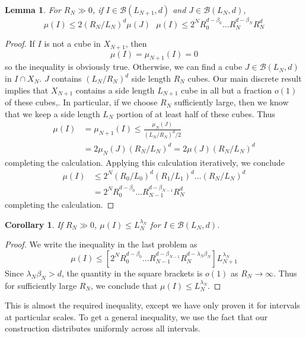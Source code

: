 \documentclass{article}
\theoremstyle{plain}
\newtheorem{lemma}{Lemma}
\newtheorem*{corollary}{Corollary}
\theoremstyle{plain}
\begin{document}
\begin{multicols}{2}
\begin{lemma}
	For $R_N \gg 0$, if $I \in \mathcal{B}(L_{N+1},d)$ and $J \in \mathcal{B}(L_N,d)$,
	\[ \mu(I) \leq 2 (R_N/L_N)^d \mu(J)\ \ \ \mu(I) \leq 2^N R_0^{d - \beta_0} \dots R_N^{d - \beta_N} R_N^d \]
\end{lemma}
\begin{proof}
	If $I$ is not a cube in $X_{N+1}$, then
	\[ \mu(I) = \mu_{N+1}(I) = 0 \]
	so the inequality is obviously true. Otherwise, we can find a cube $J \in \mathcal{B}(L_N,d)$ in $I \cap X_N$. $J$ contains $(L_N/R_N)^d$ side length $R_N$ cubes. Our main discrete result implies that $X_{N+1}$ contains a side length $L_{N+1}$ cube in all but a fraction $o(1)$ of these cubes,. In particular, if we choose $R_N$ sufficiently large, then we know that we keep a side length $L_N$ portion of at least half of these cubes. Thus
	\begin{align*}
		\mu(I) &= \mu_{N+1}(I) \leq \frac{\mu_N(J)}{(L_N/R_N)^d/2}\\
		&= 2 \mu_N(J) (R_N/L_N)^d = 2 \mu(J) (R_N/L_N)^d
	\end{align*}
	completing the calculation. Applying this calculation iteratively, we conclude
	\begin{align*}
		\mu(I) &\leq 2^N (R_0/L_0)^d (R_1/L_1)^d \dots (R_N/L_N)^d\\
		&= 2^N R_0^{d - \beta_0} \dots R_{N-1}^{d - \beta_{N-1}} R_N^d
	\end{align*}
	completing the calculation.
\end{proof}

\begin{corollary}
	If $R_N \gg 0$, $\mu(I) \leq L_N^{\lambda_N}$ for $I \in \mathcal{B}(L_N,d)$.
\end{corollary}
\begin{proof}
	We write the inequality in the last problem as
	\[ \mu(I) \leq [2^N R_0^{d - \beta_0} \dots R_{N-1}^{d - \beta_{N-1}} R_N^{d - \lambda_N \beta_N}] L_{N+1}^{\lambda_N} \]
	Since $\lambda_N \beta_N > d$, the quantity in the square brackets is $o(1)$ as $R_N \to \infty$. Thus for sufficiently large $R_N$, we conclude that $\mu(I) \leq L_N^{\lambda_N}$.
\end{proof}

This is almost the required inequality, except we have only proven it for intervals at particular scales. To get a general inequality, we use the fact that our construction distributes uniformly across all intervals.


\end{multicols}
\end{document}

